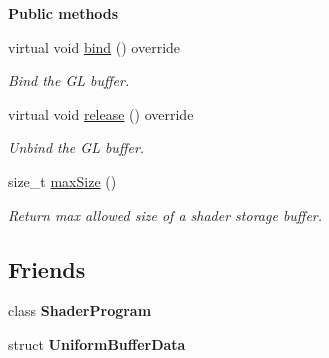 \begin{Indent}\textbf{ Public methods}\par
\begin{DoxyCompactItemize}
\item 
\mbox{\label{classrev_1_1_shader_storage_buffer_a7263b00dbd6388ab5e1ff8cc6d07a71a}} 
virtual void \mbox{\hyperlink{classrev_1_1_shader_storage_buffer_a7263b00dbd6388ab5e1ff8cc6d07a71a}{bind}} () override
\begin{DoxyCompactList}\small\item\em Bind the GL buffer. \end{DoxyCompactList}\item 
\mbox{\label{classrev_1_1_shader_storage_buffer_aebf0376c57ff355707447533263034fc}} 
virtual void \mbox{\hyperlink{classrev_1_1_shader_storage_buffer_aebf0376c57ff355707447533263034fc}{release}} () override
\begin{DoxyCompactList}\small\item\em Unbind the GL buffer. \end{DoxyCompactList}\item 
\mbox{\label{classrev_1_1_shader_storage_buffer_ab5e2396c1d0bfc36f1e26c47cc85471e}} 
size\+\_\+t \mbox{\hyperlink{classrev_1_1_shader_storage_buffer_ab5e2396c1d0bfc36f1e26c47cc85471e}{max\+Size}} ()
\begin{DoxyCompactList}\small\item\em Return max allowed size of a shader storage buffer. \end{DoxyCompactList}\end{DoxyCompactItemize}
\end{Indent}
\subsection*{Friends}
\begin{DoxyCompactItemize}
\item 
\mbox{\label{classrev_1_1_shader_storage_buffer_aef20119bde6aff11ffd23f3ea2131b86}} 
class {\bfseries Shader\+Program}
\item 
\mbox{\label{classrev_1_1_shader_storage_buffer_ad822365c23ec45fc98317c00b733bb02}} 
struct {\bfseries Uniform\+Buffer\+Data}
\end{DoxyCompactItemize}
